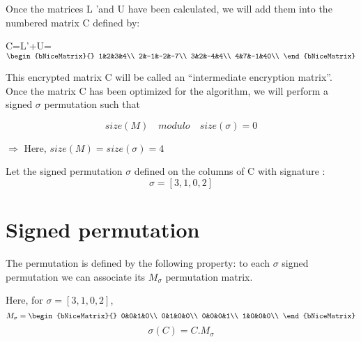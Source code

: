 \documentclass{article}
\begin{document}
\begin{flushleft}
Once the matrices L 'and U have been calculated, we will add them into the numbered matrix C defined by:
\end{flushleft}
\begin{center}
C=L'+U=
$
\begin{bNiceMatrix}{}
1&2&3&4\\
2&-1&-2&-7\\
3&2&-4&4\\
4&7&-1&40\\
\end{bNiceMatrix}
$
\end{center}
\begin{flushleft}
This encrypted matrix C will be called an “intermediate encryption matrix”.
\newline
\\
Once the matrix C has been optimized for the algorithm, we will perform a signed $\sigma$ permutation such that 
\end{flushleft}

$$size(M) \quad modulo \quad size(\sigma) = 0$$

$\Longrightarrow$ Here, $size(M)=size(\sigma)=4$
\newline
\\
\begin{flushleft}
Let the signed permutation $\sigma$ defined on the columns of C with signature :\\
 $$\sigma = [3,1,0,2]$$
\end{flushleft}
\newpage
\section*{Signed permutation}
\begin{flushleft}
The permutation is defined by the following property: to each $\sigma$ signed permutation we can associate its $M_{\sigma}$ permutation matrix.
\newline
\\
\end{flushleft}

Here, for $\sigma = [3,1,0,2]$,
$$
 M_{\sigma}=
\begin{bNiceMatrix}{}
	0&0&1&0\\
	0&1&0&0\\
	0&0&0&1\\
	1&0&0&0\\
\end{bNiceMatrix}
$$
$$
\boxed{
\sigma(C)=C.M_{\sigma}}$$
\end{document}
